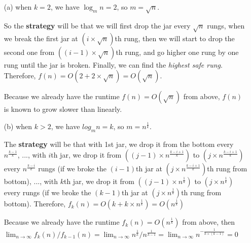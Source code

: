 \documentclass[12pt,letterpaper]{article}
\begin{document}
\begin{itemize}
    \item[(a)] when $k=2$, we have $\log_{m}n=2$, so $m=\sqrt{n}$. 
    
    So the \textbf{strategy} will be that we will first drop the jar every $\sqrt{n}$ 
    rungs, when we break the first jar at $(i \times \sqrt{n})$th rung, then we 
    will start to drop the second one from $((i - 1) \times \sqrt{n})$th rung, and
    go higher one rung by one rung until the jar is broken. Finally, we can find
    the \textit{highest safe rung}. Therefore, $f(n) = O(2 + 2 \times \sqrt{n}) =
    O(\sqrt{n})$. 
    
    Because we already have the runtime $f(n) = O(\sqrt{n})$ from above, $f(n)$ 
    is known to grow slower than linearly.
    
    \item[(b)] when $k > 2$, we have $log_{m}n=k$, so $m=n^{\frac{1}{k}}$.
    
    The \textbf{strategy} will be that with 1st jar, we drop it from the bottom every 
    $n^{\frac{k-1}{k}}$, ..., with $i$th jar, we drop it from $((j - 1) \times 
    n^{\frac{k-i+1}{k}})$ to $(j \times n^{\frac{k-i+1}{k}})$ every 
    $n^{\frac{k-i}{k}}$ rungs (if we broke the $(i -1)$th jar at 
    $(j \times n^{\frac{k-i+1}{k}})$th rung from bottom), ..., with $k$th jar,
    we drop it from $((j - 1) \times n^{\frac{1}{k}})$ to 
    $(j \times n^{\frac{1}{k}})$ every rungs (if we broke the $(k -1)$th jar at 
    $(j \times n^{\frac{1}{k}})$th rung from bottom). Therefore, $f_k(n) = 
    O(k + k \times n^{\frac{1}{k}})=O(n^{\frac{1}{k}})$
    
    Because we already have the runtime $f_k(n)=O(n^{\frac{1}{k}})$ from 
    above, then $\lim_{n \rightarrow \infty} f_k(n)/f_{k-1}(n) = 
    \lim_{n \rightarrow \infty} n^{\frac{1}{k}}/n^{\frac{1}{k-1}} = 
    \lim_{n \rightarrow \infty} n^{-\frac{1}{k\times(k-1)}} = 0$    
\end{itemize}
\end{document}
